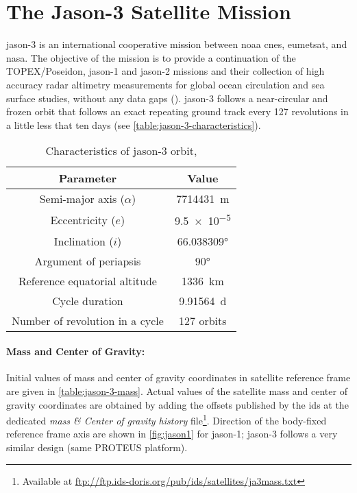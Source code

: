 \section{The Jason-3 Satellite Mission}\label{sec:jason-3}

\gls{jason}-3 is an international cooperative mission between \gls{noaa} 
\gls{cnes}, \gls{eumetsat}, and \gls{nasa}. The objective of the mission is to 
provide a continuation of the TOPEX/Poseidon, \gls{jason}-1 and \gls{jason}-2 
missions and their collection of high accuracy radar altimetry 
measurements for global ocean circulation and sea surface studies, without any 
data gaps (\cite{Couderc2015}). \gls{jason}-3 follows a near-circular and frozen orbit 
that follows an exact repeating ground track every 127 revolutions in a little 
less that ten days (see \autoref{table:jason-3-characteristics}).

\begin{table}[h]
    \centering
    \begin{tabular}{c|c}
        \textbf{Parameter} & \textbf{Value} \\
        \toprule
        Semi-major axis ($\alpha$) & \SI{7714431}{\meter} \\
        Eccentricity ($e$) & \num{9.5e-5} \\
        Inclination ($i$) & \ang{66.038309} \\
        Argument of periapsis & \ang{90} \\
        Reference equatorial altitude & \SI{1336}{\kilo\meter} \\
        Cycle duration & \SI{9.91564}{\day} \\
        Number of revolution in a cycle & 127 orbits \\
        \bottomrule
    \end{tabular}
    \caption{Characteristics of \gls{jason}-3 orbit, \cite{Couderc2015}}
    \label{table:jason-3-characteristics}
\end{table}

\paragraph{Mass and Center of Gravity:}
Initial values of mass and center of gravity coordinates in satellite reference 
frame are given in \autoref{table:jason-3-mass}. Actual values of the satellite 
mass and center of gravity coordinates are obtained by adding the offsets
published by the \gls{ids} at the dedicated \emph{mass \& Center of gravity history} 
file\footnote{Available at \url{ftp://ftp.ids-doris.org/pub/ids/satellites/ja3mass.txt}}.
Direction of the body-fixed reference frame axis are shown in \autoref{fig:jason1} 
for \gls{jason}-1; \gls{jason}-3 follows a very similar design (same PROTEUS platform). 

